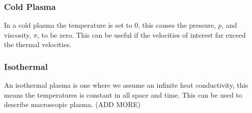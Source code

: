	\subsubsection{Cold Plasma}
	In a cold plasma the temperature is set to \(0\), this causes the pressure, \(p\), and viscosity, \(\pi\), to be zero.
	This can be useful if the velocities of interest far exceed the thermal velocities. 



	\subsubsection{Isothermal}
	An isothermal plasma is one where we assume an infinite heat conductivity,
	this means the temperatures is constant in all space and time. This can be used to
	describe macroscopic plasma.
	(ADD MORE)
